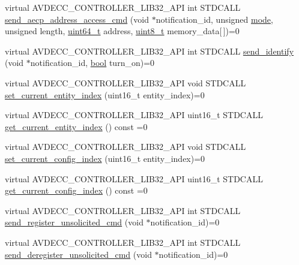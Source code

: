 \begin{DoxyCompactItemize}
virtual A\+V\+D\+E\+C\+C\+\_\+\+C\+O\+N\+T\+R\+O\+L\+L\+E\+R\+\_\+\+L\+I\+B32\+\_\+\+A\+PI int S\+T\+D\+C\+A\+LL \hyperlink{classavdecc__lib_1_1end__station_acf650400905c50722aab71ac7fa4f44c}{send\+\_\+aecp\+\_\+address\+\_\+access\+\_\+cmd} (void $\ast$notification\+\_\+id, unsigned \hyperlink{rawsock__tx_8c_a1ea5d0cb93f22f7d0fdf804bd68c3326}{mode}, unsigned length, \hyperlink{parse_8c_aec6fcb673ff035718c238c8c9d544c47}{uint64\+\_\+t} address, \hyperlink{stdint_8h_aba7bc1797add20fe3efdf37ced1182c5}{uint8\+\_\+t} memory\+\_\+data\mbox{[}$\,$\mbox{]})=0
\item 
virtual A\+V\+D\+E\+C\+C\+\_\+\+C\+O\+N\+T\+R\+O\+L\+L\+E\+R\+\_\+\+L\+I\+B32\+\_\+\+A\+PI int S\+T\+D\+C\+A\+LL \hyperlink{classavdecc__lib_1_1end__station_af0d6fb82fdf81914bb248266625f8cea}{send\+\_\+identify} (void $\ast$notification\+\_\+id, \hyperlink{avb__gptp_8h_af6a258d8f3ee5206d682d799316314b1}{bool} turn\+\_\+on)=0
\item 
virtual A\+V\+D\+E\+C\+C\+\_\+\+C\+O\+N\+T\+R\+O\+L\+L\+E\+R\+\_\+\+L\+I\+B32\+\_\+\+A\+PI void S\+T\+D\+C\+A\+LL \hyperlink{classavdecc__lib_1_1end__station_ac5076f06b60c9882e2f278d6983122b5}{set\+\_\+current\+\_\+entity\+\_\+index} (uint16\+\_\+t entity\+\_\+index)=0
\item 
virtual A\+V\+D\+E\+C\+C\+\_\+\+C\+O\+N\+T\+R\+O\+L\+L\+E\+R\+\_\+\+L\+I\+B32\+\_\+\+A\+PI uint16\+\_\+t S\+T\+D\+C\+A\+LL \hyperlink{classavdecc__lib_1_1end__station_aaf7e2defcfdf88c62c04fd88bd49787d}{get\+\_\+current\+\_\+entity\+\_\+index} () const =0
\item 
virtual A\+V\+D\+E\+C\+C\+\_\+\+C\+O\+N\+T\+R\+O\+L\+L\+E\+R\+\_\+\+L\+I\+B32\+\_\+\+A\+PI void S\+T\+D\+C\+A\+LL \hyperlink{classavdecc__lib_1_1end__station_ae9080ba4b1349938540001fc49cb39b0}{set\+\_\+current\+\_\+config\+\_\+index} (uint16\+\_\+t entity\+\_\+index)=0
\item 
virtual A\+V\+D\+E\+C\+C\+\_\+\+C\+O\+N\+T\+R\+O\+L\+L\+E\+R\+\_\+\+L\+I\+B32\+\_\+\+A\+PI uint16\+\_\+t S\+T\+D\+C\+A\+LL \hyperlink{classavdecc__lib_1_1end__station_abaf546b5bb641dcf161f895e3d6d8cd8}{get\+\_\+current\+\_\+config\+\_\+index} () const =0
\item 
virtual A\+V\+D\+E\+C\+C\+\_\+\+C\+O\+N\+T\+R\+O\+L\+L\+E\+R\+\_\+\+L\+I\+B32\+\_\+\+A\+PI int S\+T\+D\+C\+A\+LL \hyperlink{classavdecc__lib_1_1end__station_a6cbbd31a079f28038babf5fec3fceca5}{send\+\_\+register\+\_\+unsolicited\+\_\+cmd} (void $\ast$notification\+\_\+id)=0
\item 
virtual A\+V\+D\+E\+C\+C\+\_\+\+C\+O\+N\+T\+R\+O\+L\+L\+E\+R\+\_\+\+L\+I\+B32\+\_\+\+A\+PI int S\+T\+D\+C\+A\+LL \hyperlink{classavdecc__lib_1_1end__station_a34993a0bebfa643e41a6e8b96277a3a3}{send\+\_\+deregister\+\_\+unsolicited\+\_\+cmd} (void $\ast$notification\+\_\+id)=0
\end{DoxyCompactItemize}


